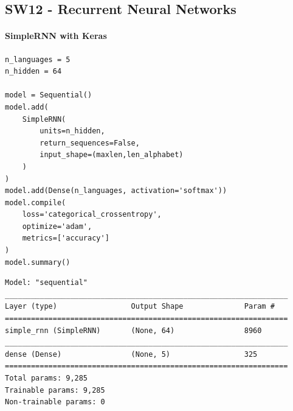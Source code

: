 \documentclass[11pt]{article}
\begin{document}
\subsection{SW12 - Recurrent Neural Networks}
\paragraph{SimpleRNN with Keras}
\begin{verbatim}
n_languages = 5
n_hidden = 64

model = Sequential()
model.add(
	SimpleRNN(
		units=n_hidden,
		return_sequences=False,
		input_shape=(maxlen,len_alphabet)
	)
)
model.add(Dense(n_languages, activation='softmax'))
model.compile(
	loss='categorical_crossentropy',
	optimize='adam',
	metrics=['accuracy']
)
model.summary()
\end{verbatim}
\begin{small}
	\begin{verbatim}
Model: "sequential"
_________________________________________________________________
Layer (type)                 Output Shape              Param #   
=================================================================
simple_rnn (SimpleRNN)       (None, 64)                8960      
_________________________________________________________________
dense (Dense)                (None, 5)                 325       
=================================================================
Total params: 9,285
Trainable params: 9,285
Non-trainable params: 0
	\end{verbatim}
\end{small}
\end{document}
